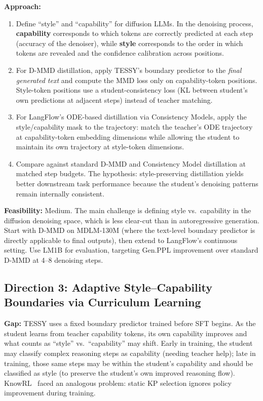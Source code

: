 \documentclass[11pt]{article}
\begin{document}
\textbf{Approach:}
\begin{enumerate}
    \item Define ``style'' and ``capability'' for diffusion LLMs. In the denoising process, \textbf{capability} corresponds to which tokens are correctly predicted at each step (accuracy of the denoiser), while \textbf{style} corresponds to the order in which tokens are revealed and the confidence calibration across positions.

    \item For D-MMD distillation, apply TESSY's boundary predictor to the \textit{final generated text} and compute the MMD loss only on capability-token positions. Style-token positions use a student-consistency loss (KL between student's own predictions at adjacent steps) instead of teacher matching.

    \item For LangFlow's ODE-based distillation via Consistency Models, apply the style/capability mask to the trajectory: match the teacher's ODE trajectory at capability-token embedding dimensions while allowing the student to maintain its own trajectory at style-token dimensions.

    \item Compare against standard D-MMD and Consistency Model distillation at matched step budgets. The hypothesis: style-preserving distillation yields better downstream task performance because the student's denoising patterns remain internally consistent.
\end{enumerate}

\textbf{Feasibility:} Medium. The main challenge is defining style vs.\ capability in the diffusion denoising space, which is less clear-cut than in autoregressive generation. Start with D-MMD on MDLM-130M (where the text-level boundary predictor is directly applicable to final outputs), then extend to LangFlow's continuous setting. Use LM1B for evaluation, targeting Gen.PPL improvement over standard D-MMD at 4--8 denoising steps.

\subsection{Direction 3: Adaptive Style--Capability Boundaries via Curriculum Learning}

\textbf{Gap:} TESSY uses a fixed boundary predictor trained before SFT begins. As the student learns from teacher capability tokens, its own capability improves and what counts as ``style'' vs.\ ``capability'' may shift. Early in training, the student may classify complex reasoning steps as capability (needing teacher help); late in training, those same steps may be within the student's capability and should be classified as style (to preserve the student's own improved reasoning flow). KnowRL~\cite{knowrl} faced an analogous problem: static KP selection ignores policy improvement during training.
\end{document}
